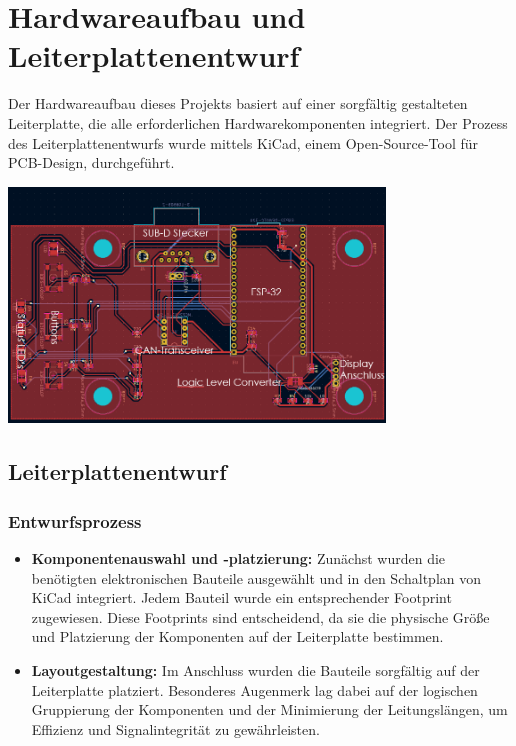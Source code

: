 \chapter{Hardwareaufbau und Leiterplattenentwurf}
\label{sec:Hardware}



\noindent Der Hardwareaufbau dieses Projekts basiert auf einer sorgfältig gestalteten Leiterplatte, die alle erforderlichen Hardwarekomponenten integriert. Der Prozess des Leiterplattenentwurfs wurde mittels KiCad, einem Open-Source-Tool für PCB-Design, durchgeführt.\\

\begin {centering}
\includegraphics[width=0.75\textwidth]{img/Leiterplate.png}
\label{fig: Leiterplattenentwurf}
\end {centering}  

\section{Leiterplattenentwurf}
\subsection{Entwurfsprozess}
\begin{itemize}
    \item \textbf{Komponentenauswahl und -platzierung:} Zunächst wurden die benötigten elektronischen Bauteile ausgewählt und in den Schaltplan von KiCad integriert. Jedem Bauteil wurde ein entsprechender Footprint zugewiesen. Diese Footprints sind entscheidend, da sie die physische Größe und Platzierung der Komponenten auf der Leiterplatte bestimmen.
    \item \textbf{Layoutgestaltung:} Im Anschluss wurden die Bauteile sorgfältig auf der Leiterplatte platziert. Besonderes Augenmerk lag dabei auf der logischen Gruppierung der Komponenten und der Minimierung der Leitungslängen, um Effizienz und Signalintegrität zu gewährleisten.
\end{itemize}

